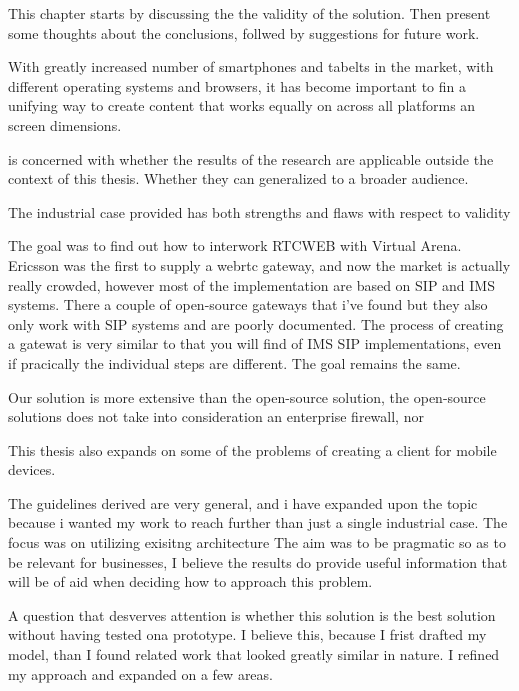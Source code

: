 
This chapter starts by discussing the the validity of the solution. Then present some thoughts about the conclusions, follwed by suggestions for future work.

With greatly increased number of smartphones and tabelts in the market, with different operating systems and browsers, it has become important to fin a unifying way to create content that works equally on across all platforms an screen dimensions.



is concerned with whether the results of the research are applicable outside the context of this thesis. Whether they can generalized to a broader audience.

The industrial case provided
has both strengths and flaws with respect to validity

The goal was to find out how to interwork RTCWEB with Virtual Arena. Ericsson was the first to supply a webrtc gateway, and now the market is actually really crowded, however most of the implementation are based on SIP and IMS systems. There a couple of open-source gateways that i've found but they also only work with SIP systems and are poorly documented. The process of creating a gatewat is very similar to that you will find of IMS SIP implementations, even if pracically the individual steps are different. The goal remains the same.

Our solution is more extensive than the open-source solution, the open-source solutions does not take into consideration an enterprise firewall, nor

This thesis also expands on some of the problems of creating a client for mobile devices.

The guidelines derived are very general, and i have expanded upon the topic because i wanted my work to reach further than just a single industrial case. The focus was on utilizing exisitng architecture
The aim was to be pragmatic so as to be relevant for businesses, I believe the results do provide useful information that will be of aid when deciding how to approach this problem.

A question that desverves attention is whether this solution is the best solution without having tested ona prototype. I believe this, because I frist drafted my model, than I found related work that looked greatly similar in nature. I refined my approach and expanded on a few areas.


